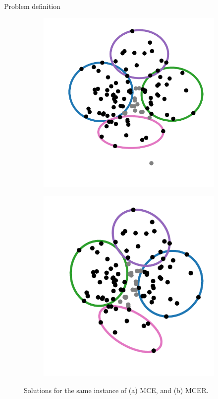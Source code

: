 \documentclass{beamer}
\theoremstyle{definition}
\begin{document}
\begin{frame}{Problem definition}
	\begin{figure}
		\begin{subfigure}{.4\textwidth}
			\centering
			\includegraphics[scale=.55]{../article/figures/MCE_TA04}
			\caption{}
			\label{fig:MCE_TA04}
		\end{subfigure}
		\begin{subfigure}{.4\textwidth}
			\centering
			\includegraphics[scale=.55]{../article/figures/MCER_TA04}
			\caption{}
			\label{fig:MCER_TA04}
		\end{subfigure}
		\caption{Solutions for the same instance of (a) MCE, and (b) MCER.}
		\label{fig:TA04}
	\end{figure}
\end{frame}
\end{document}
